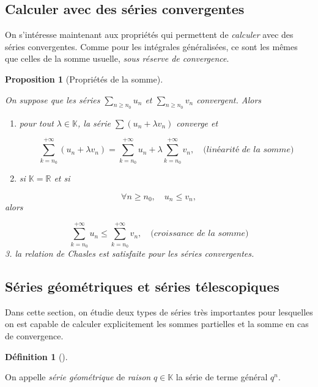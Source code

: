 \documentclass[
  french,
  letterpaper,
  DIV=11,
  numbers=noendperiod]{scrreprt}
\theoremstyle{plain}
\theoremstyle{definition}
\newtheorem{definition}{Définition}[chapter]
\theoremstyle{plain}
\newtheorem{proposition}{Proposition}[chapter]
\theoremstyle{plain}
\theoremstyle{definition}
\theoremstyle{definition}
\theoremstyle{plain}
\theoremstyle{remark}
\begin{document}
\subsection{Calculer avec des séries
convergentes}\label{calculer-avec-des-suxe9ries-convergentes}

On s'intéresse maintenant aux propriétés qui permettent de
\emph{calculer} avec des séries convergentes. Comme pour les intégrales
généralisées, ce sont les mêmes que celles de la somme usuelle,
\emph{sous réserve de convergence}.

\begin{proposition}[Propriétés de la
somme]\protect\hypertarget{prp-propriete-somme}{}\label{prp-propriete-somme}

On suppose que les séries \(\sum_{n \geqslant n_{0}} u_{n}\) et
\(\sum_{n \geqslant n_{0}} v_n\) convergent. Alors

\begin{enumerate}
\def\labelenumi{\arabic{enumi}.}
\item
  pour tout \(\lambda \in \mathbb{K}\), la série
  \(\sum (u_{n}+\lambda v_{n})\) converge et

  \[
   \sum_{k=n_{0}}^{+\infty} (u_{n}+ \lambda v_{n}) = \sum_{k=n_{0}}^{+\infty}
  u_{n} + \lambda\sum_{k=n_{0}}^{+\infty} v_{n},\quad \textit{(linéarité de la
  somme)}
  \]
\item
  si \(\mathbb{K}=\mathbb{R}\) et si
\end{enumerate}

\[
    \forall n \geqslant n_{0},\quad u_{n}\leqslant v_{n},
\] alors

\[
    \sum_{k=n_{0}}^{+\infty} u_{n} \leqslant\sum_{k=n_{0}}^{+\infty}
v_{n},\quad \textit{(croissance de la somme)}
\] 3. la relation de Chasles est satisfaite pour les séries
convergentes.

\end{proposition}

\subsection{Séries géométriques et séries
télescopiques}\label{suxe9ries-guxe9omuxe9triques-et-suxe9ries-tuxe9lescopiques}

Dans cette section, on étudie deux types de séries très importantes pour
lesquelles on est capable de calculer explicitement les sommes
partielles et la somme en cas de convergence.

\begin{definition}[]\protect\hypertarget{def-serie-geometrique}{}\label{def-serie-geometrique}

On appelle \emph{série géométrique} de \emph{raison}
\(q \in \mathbb{K}\) la série de terme général \(q^{n}\).

\end{definition}
\end{document}
